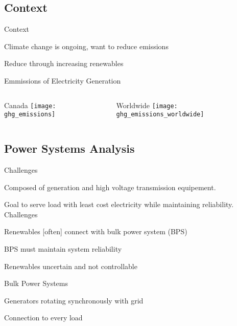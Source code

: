 \subsection{Context}
\begin{frame}{Context}
\bi
\item Climate change is ongoing, want to reduce emissions
\item Reduce through increasing renewables
\ei

\pause
\centering
\vspace{.2in}
\alert{Emmissions of Electricity Generation}
\vspace{.2in}
\begin{columns}
\begin{column}{0.425\textwidth}
\centering
Canada
\texttt{[image: ghg\_emissions]}
\end{column}
\begin{column}{0.425\textwidth}
\centering
Worldwide
\texttt{[image: ghg\_emissions\_worldwide]}
\end{column}
\end{columns}
\end{frame}

\subsection{Power Systems Analysis}
\begin{frame}{Challenges}


\bi
\item Composed of generation and high voltage transmission equipement.  
\item Goal to serve load with least cost electricity while maintaining reliability.
\ei
\EBR
\pause
\vspace{.3in}
\alert{Challenges}
\bi
\item Renewables [often] connect with bulk power system (BPS)
\item BPS must maintain system reliability
\item Renewables uncertain and not controllable
\ei
\end{frame}

\begin{frame}{Bulk Power Systems}


\bi
\item Generators rotating synchronously with grid
\item Connection to every load
\ei



\end{frame}

